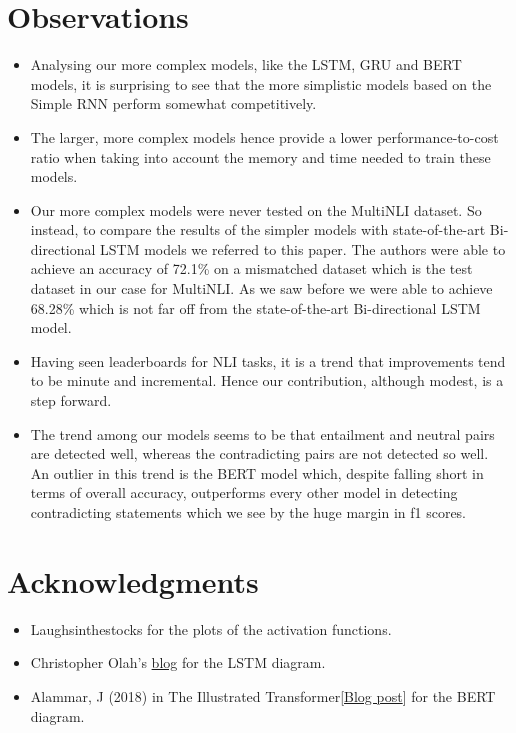 \documentclass[12pt, conference]{IEEEtran}
\begin{document}
\section{Observations}
\begin{itemize}
    \item{Analysing our more complex models, like the LSTM, GRU and BERT models, it is surprising to see that the more simplistic models based on the Simple RNN perform somewhat competitively.}
    \item{The larger, more complex models hence provide a lower performance-to-cost ratio when taking into account the memory and time needed to train these models.}
    \item{Our more complex models were never tested on the MultiNLI dataset. So instead, to compare the results of the simpler models with state-of-the-art Bi-directional LSTM models we referred to this \cite{b5} paper. The authors were able to achieve an accuracy of 72.1\% on a mismatched dataset which is the test dataset in our case for MultiNLI. As we saw before we were able to achieve 68.28\% which is not far off from the state-of-the-art Bi-directional LSTM model.}
    \item{Having seen leaderboards for NLI tasks, it is a trend that improvements tend to be minute and incremental. Hence our contribution, although modest, is a step forward.}
    \item{The trend among our models seems to be that entailment and neutral pairs are detected well, whereas the contradicting pairs are not detected so well. An outlier in this trend is the BERT model which, despite falling short in terms of overall accuracy, outperforms every other model in detecting contradicting statements which we see by the huge margin in f1 scores.}
\end{itemize}





\section*{Acknowledgments}
\begin{itemize}
    \item{Laughsinthestocks for the plots of the activation functions.}
    \item{Christopher Olah's \href{https://colah.github.io/posts/2015-08-Understanding-LSTMs/}{blog} for the LSTM diagram.}
    \item{Alammar, J (2018) in The Illustrated Transformer[\href{https://jalammar.github.io/illustrated-transformer/}{Blog post}] for the BERT diagram.}
\end{itemize}
\end{document}
